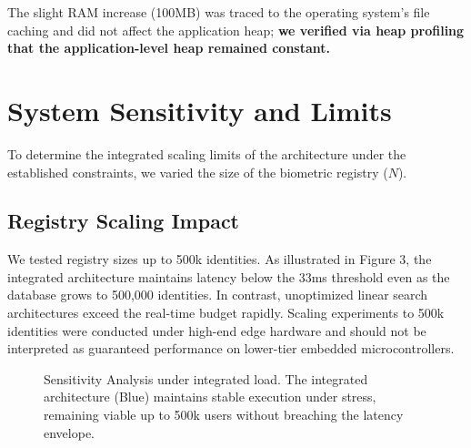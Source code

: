 \documentclass[conference]{IEEEtran}
\begin{document}
The slight RAM increase (100MB) was traced to the operating system's file caching and did not affect the application heap; \textbf{we verified via heap profiling that the application-level heap remained constant.} 

\section{System Sensitivity and Limits}
To determine the integrated scaling limits of the architecture under the established constraints, we varied the size of the biometric registry ($N$).

\subsection{Registry Scaling Impact}
We tested registry sizes up to 500k identities. As illustrated in Figure 3, the integrated architecture maintains latency below the 33ms threshold even as the database grows to 500,000 identities. In contrast, unoptimized linear search architectures exceed the real-time budget rapidly. Scaling experiments to 500k identities were conducted under high-end edge hardware and should not be interpreted as guaranteed performance on lower-tier embedded microcontrollers.

\begin{figure}[htbp]
\centering
{}
\caption{Sensitivity Analysis under integrated load. The integrated architecture (Blue) maintains stable execution under stress, remaining viable up to 500k users without breaching the latency envelope.}
\label{fig:scaling}
\end{figure}
\end{document}
